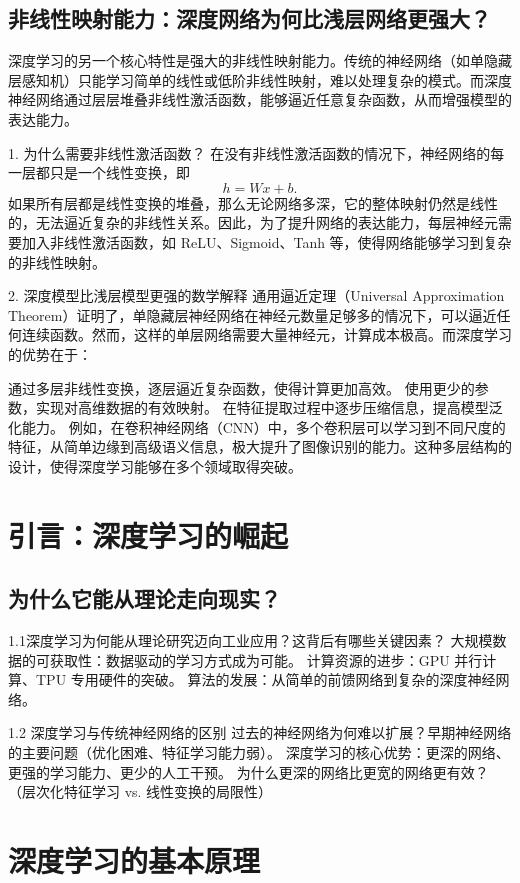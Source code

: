 \subsection{非线性映射能力：深度网络为何比浅层网络更强大？}
深度学习的另一个核心特性是强大的非线性映射能力。传统的神经网络（如单隐藏层感知机）只能学习简单的线性或低阶非线性映射，难以处理复杂的模式。而深度神经网络通过层层堆叠非线性激活函数，能够逼近任意复杂函数，从而增强模型的表达能力。

1. 为什么需要非线性激活函数？
在没有非线性激活函数的情况下，神经网络的每一层都只是一个线性变换，即
$$ h = Wx +b.$$
如果所有层都是线性变换的堆叠，那么无论网络多深，它的整体映射仍然是线性的，无法逼近复杂的非线性关系。因此，为了提升网络的表达能力，每层神经元需要加入非线性激活函数，如 ReLU、Sigmoid、Tanh 等，使得网络能够学习到复杂的非线性映射。

2. 深度模型比浅层模型更强的数学解释
通用逼近定理（Universal Approximation Theorem）证明了，单隐藏层神经网络在神经元数量足够多的情况下，可以逼近任何连续函数。然而，这样的单层网络需要大量神经元，计算成本极高。而深度学习的优势在于：

通过多层非线性变换，逐层逼近复杂函数，使得计算更加高效。
使用更少的参数，实现对高维数据的有效映射。
在特征提取过程中逐步压缩信息，提高模型泛化能力。
例如，在卷积神经网络（CNN）中，多个卷积层可以学习到不同尺度的特征，从简单边缘到高级语义信息，极大提升了图像识别的能力。这种多层结构的设计，使得深度学习能够在多个领域取得突破。




\section{引言：深度学习的崛起}
\subsection{为什么它能从理论走向现实？}
1.1深度学习为何能从理论研究迈向工业应用？这背后有哪些关键因素？
大规模数据的可获取性：数据驱动的学习方式成为可能。
计算资源的进步：GPU 并行计算、TPU 专用硬件的突破。
算法的发展：从简单的前馈网络到复杂的深度神经网络。

1.2 深度学习与传统神经网络的区别
过去的神经网络为何难以扩展？早期神经网络的主要问题（优化困难、特征学习能力弱）。
深度学习的核心优势：更深的网络、更强的学习能力、更少的人工干预。
为什么更深的网络比更宽的网络更有效？（层次化特征学习 vs. 线性变换的局限性）

\section{深度学习的基本原理}
